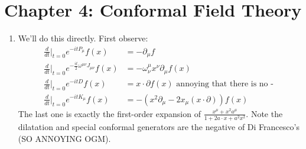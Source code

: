 \documentclass[11pt]{article}
\begin{document}
	

\section*{Chapter 4: Conformal Field Theory} %
\label{sec:chapter_4_conformal_field_theory}

\begin{enumerate}
	\item We'll do this directly. First observe:
	\begin{equation}
		\begin{aligned}
			\frac{d}{dt}|_{t=0} e^{-i t P_\mu} f(x) &= -\partial_\mu f\\
			\frac{d}{dt}|_{t=0} e^{-\frac{i t}{2} \omega^{\mu \nu} J_{\mu \nu}} f(x) &= - \omega^{\mu}_\nu x^\nu \partial_\mu f(x)\\
			\frac{d}{dt}|_{t=0} e^{-i t D} f(x) &= x \cdot \partial f(x) \text{ annoying that there is no - }\\
			\frac{d}{dt}|_{t=0} e^{-i t K_\mu} f(x) &= - (x^2 \partial_\mu - 2 x_\mu (x \cdot \partial)) f(x)
		\end{aligned}
	\end{equation}
	The last one is exactly the first-order expansion of $\frac{x^\mu + x^2 a^\mu}{1 + 2 a \cdot x + a^2 x^2}$. 
	Note the dilatation and special conformal generators are the negative of Di Francesco's (SO ANNOYING OGM).
	

\end{enumerate}
\end{document}
